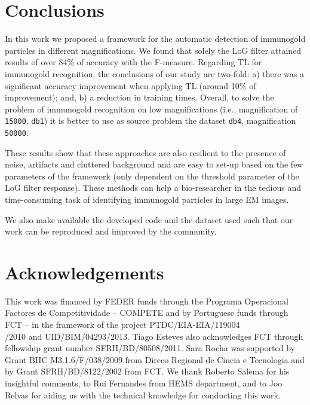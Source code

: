 \documentclass[a4paper,11pt]{article}
\newcommand{\1}{\mathbbm{1}}
\newcommand{\db}[1]{\texttt{#1}}
\theoremstyle{plain}
\begin{document}
\section{Conclusions}
\label{sec:conclusions}

In this work we proposed a framework for the automatic detection of immunogold particles in different magnifications. We found that solely the \ac{LoG} filter attained results of over 84\% of accuracy with the F-measure.
Regarding \ac{TL} for immunogold recognition, the conclusions of our study are two-fold: a) there was a significant accuracy improvement when applying \ac{TL} (around 10\% of improvement); and, b) a reduction in training times. Overall, to solve the problem of immunogold recognition on low magnifications (i.e., magnification of \db{15000}, \db{db1}) it is better to use as source problem the dataset \db{db4}, magnification \db{50000}.

These results show that these approaches are also resilient to the presence of noise, artifacts and cluttered background and are easy to set-up based on the few parameters of the framework (only dependent on the threshold parameter of the \ac{LoG} filter response).
These methods can help a bio-researcher in the tedious and time-consuming task of identifying immunogold particles in large EM images.

We also make available the developed code and the dataset used such that our work can be reproduced and improved by the community.


\section{Acknowledgements}
This work was financed by FEDER funds through the Programa Operacional Factores de Competitividade – COMPETE and by Portuguese funds through FCT – in the framework of the project PTDC/EIA-EIA/119004\\/2010 and UID/BIM/04293/2013.
Tiago Esteves also acknowledges FCT through fellowship grant number SFRH/BD/80508/2011.
Sara Rocha was supported by Grant BIIC M3.1.6/F/038/2009 from Direco Regional de Cincia e Tecnologia and by Grant SFRH/BD/8122/2002 from FCT.
We thank Roberto Salema for his insightful comments, to Rui Fernandes from HEMS department, and to Joo Relvas for aiding us with the technical knowledge for conducting this work.
%
\end{document}
